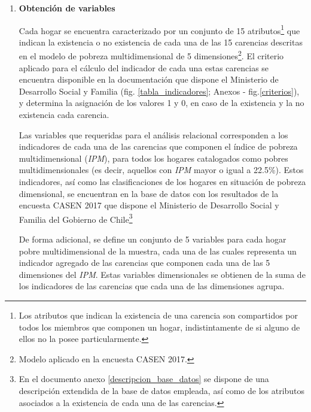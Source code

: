 \documentclass[12pt,letterpaper,spanish]{article}
\begin{document}
\begin{enumerate}
\item \textbf{Obtención de variables} 

Cada hogar se encuentra caracterizado por un conjunto de 15 atributos\footnote{Los atributos que indican la existencia de una carencia son compartidos por todos los miembros que componen un hogar, indistintamente de si alguno de ellos no la posee particularmente.} que indican la existencia o no existencia de cada una de las 15 carencias descritas en el modelo de pobreza multidimensional de 5 dimensiones\footnote{Modelo aplicado en la encuesta CASEN 2017.}. El criterio aplicado para el cálculo del indicador de cada una estas carencias se encuentra disponible en la documentación que dispone el Ministerio de Desarrollo Social y Familia (fig. \ref{tabla_indicadores}; Anexos - fig.\ref{criterios}), y determina la asignación de los valores 1 y 0, en caso de la existencia y la no existencia cada carencia. 


Las variables que requeridas para el análisis relacional corresponden a los indicadores de cada  una de las carencias que componen el índice de pobreza multidimensional (\textit{IPM}), para todos los hogares catalogados como pobres multidimensionales (es decir, aquellos con \textit{IPM} mayor o igual a 22.5\%). Estos indicadores, así como las clasificaciones de los hogares en situación de pobreza dimensional, se encuentran en la base de datos con los resultados de la encuesta CASEN 2017 que dispone el Ministerio de Desarrollo Social y Familia del Gobierno de Chile\footnote{En el documento anexo \ref{descripcion_base_datos} se dispone de una descripción extendida de la base de datos empleada, así como de los atributos asociados a la existencia de cada una de las carencias.}


De forma adicional, se define un conjunto de 5 variables para cada hogar pobre multidimensional de la muestra, cada una de las cuales representa un indicador agregado de las carencias que componen cada una de las 5 dimensiones del \textit{IPM}. Estas variables dimensionales se obtienen de la suma de los indicadores de las carencias que cada una de las dimensiones agrupa.\\


\end{enumerate}
\end{document}
